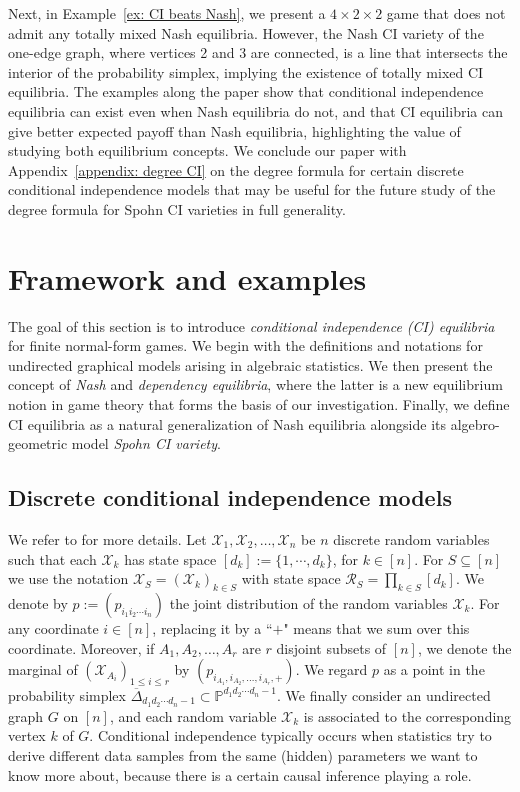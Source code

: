 \documentclass[11pt]{amsart}
\numberwithin{equation}{section}
\theoremstyle{plain}
\numberwithin{theorem}{section}
\theoremstyle{definition}
\begin{document}
\indent Next, in Example~\ref{ex: CI beats Nash}, we present a $4 \times 2 \times 2$ game that does not admit any totally mixed Nash equilibria. However, the Nash CI variety of the one-edge graph, where vertices 2 and 3 are connected, is a line that intersects the interior of the probability simplex, implying the existence of totally mixed CI equilibria. The examples along the paper show that conditional independence equilibria can exist even when Nash equilibria do not, and that CI equilibria can give better expected payoff than Nash equilibria, highlighting the value of studying both equilibrium concepts. We conclude our paper with Appendix~\ref{appendix: degree CI} on the degree formula for certain discrete conditional independence models that may be useful for the future study of the degree formula for Spohn CI varieties in full generality.


\section{Framework and examples}\label{sec: framework and examples}
The goal of this section is to introduce \emph{conditional independence (CI) equilibria} for finite normal-form games. We begin with the definitions and notations for undirected graphical models arising in algebraic statistics. We then present the concept of \emph{Nash} and \emph{dependency equilibria}, where the latter is a new equilibrium notion in game theory that forms the basis of our investigation. Finally, we define CI equilibria as a natural generalization of Nash equilibria alongside its algebro-geometric model \emph{Spohn CI variety}.


\subsection{Discrete conditional independence models}
\label{subsec CI} We refer to \cite[Chapter 4, Chapter 13]{sullivant2018algebraic} for more details. Let $\mathcal{X}_1,\mathcal{X}_2,\ldots,\mathcal{X}_n$ be $n$ discrete random variables such that each $\mathcal{X}_k$ has state space $[d_k]:=\{1, \cdots, d_k\}$, for $k \in [n]$. For $S\subseteq [n]$ we use the notation $\mathcal{X}_S=(\mathcal{X}_k)_{k\in S}$ with state space $\mathcal R_S=\prod_{k\in S}[d_k]$. We denote by $p:=(p_{i_1i_2\cdots i_n})$ the joint distribution of the random variables $\mathcal{X}_k$. For any coordinate $i\in[n]$, replacing it by a ``$+$" means that we sum over this coordinate. Moreover, if $A_1,A_2,\ldots,A_r$ are $r$ disjoint subsets of $[n]$, we denote the marginal of $(\mathcal{X}_{A_i})_{1\le i\le r}$ by $(p_{i_{A_1},i_{A_2},\ldots,i_{A_r},+})$. We regard $p$ as a point in the probability simplex $\overline\Delta_{d_1 d_2\cdots d_n-1}\subset\mathbb P^{d_1 d_2 \cdots d_n-1}$. 
We finally consider an undirected graph $G$ on $[n]$, and each random variable $\mathcal{X}_k$ is associated to the corresponding vertex $k$ of $G$.
Conditional independence typically occurs when statistics try to derive different data samples from the same (hidden) parameters we want to know more about, because there is a certain causal inference playing a role.
\end{document}
